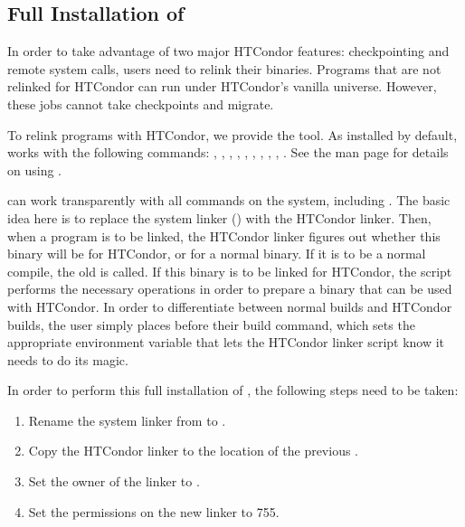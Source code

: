 \subsection{\label{sec:full-condor-compile}Full Installation of
} 

In order to take advantage of two major HTCondor features: checkpointing
and remote system calls, users need to relink
their binaries.  Programs that are not relinked for HTCondor can run 
under
HTCondor's vanilla universe. However, these jobs cannot
take checkpoints and migrate.

To relink programs with HTCondor, we provide the 
 tool.  As installed by default,  works
with the following commands: , , ,
, , , , ,
, .  
See the  man page for details on
using .

 can work transparently with all
commands on the system, including .  
The basic idea here is to replace the system linker () with
the HTCondor linker.  Then, when a program is to be linked, the HTCondor
linker figures out whether this binary will be for HTCondor, or for a
normal binary.  If it is to be a normal compile, the old  is
called.  If this binary is to be linked for HTCondor,
the script
performs the necessary operations in order to prepare a binary that
can be used with HTCondor.  In order to differentiate between normal
builds and HTCondor builds, the user simply places 
 before their build command, which sets the
appropriate environment variable that lets the HTCondor linker script
know it needs to do its magic.

In order to perform this full installation of , the
following steps need to be taken:
	
\begin{enumerate}
	\item Rename the system linker from  to .
	\item Copy the HTCondor linker to the location of the previous 
.
	\item Set the owner of the linker to .
	\item Set the permissions on the new linker to 755.
\end{enumerate}


